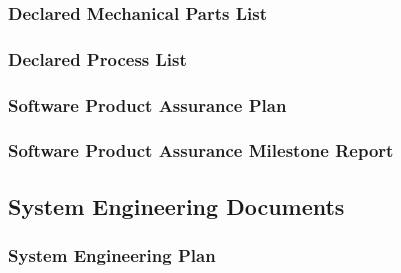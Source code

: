 \subsubsection{Declared Mechanical Parts List}
\label{app:Declared Mechanical Parts List}

\subsubsection{Declared Process List}
\label{app:Declared Process List}

\subsubsection{Software Product Assurance Plan}
\label{app:Software Product Assurance Plan}

\subsubsection{Software Product Assurance Milestone Report}
\label{app:Software Product Assurance Milestone Report}

\clearpage
\subsection{System Engineering Documents}

\subsubsection{System Engineering Plan}
\label{app:System Engineering Plan}

